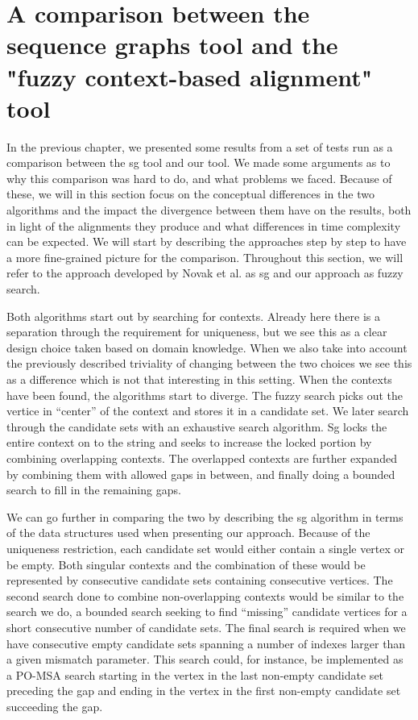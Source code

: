 \documentclass[thesis.tex]{subfiles}
\begin{document}
\section{A comparison between the sequence graphs tool and the "fuzzy context-based alignment" tool}
\label{sec:conceptual_comparison}
In the previous chapter, we presented some results from a set of tests run as a comparison between the sg tool and our tool. We made some arguments as to why this comparison was hard to do, and what problems we faced. Because of these, we will in this section focus on the conceptual differences in the two algorithms and the impact the divergence between them have on the results, both in light of the alignments they produce and what differences in time complexity can be expected. We will start by describing the approaches step by step to have a more fine-grained picture for the comparison. Throughout this section, we will refer to the approach developed by Novak et al. as sg and our approach as fuzzy search.\\
\par\noindent
Both algorithms start out by searching for contexts. Already here there is a separation through the requirement for uniqueness, but we see this as a clear design choice taken based on domain knowledge. When we also take into account the previously described triviality of changing between the two choices we see this as a difference which is not that interesting in this setting. When the contexts have been found, the algorithms start to diverge. The fuzzy search picks out the vertice in ``center'' of the context and stores it in a candidate set. We later search through the candidate sets with an exhaustive search algorithm. Sg locks the entire context on to the string and seeks to increase the locked portion by combining overlapping contexts. The overlapped contexts are further expanded by combining them with allowed gaps in between, and finally doing a bounded search to fill in the remaining gaps.\\
\par\noindent
We can go further in comparing the two by describing the sg algorithm in terms of the data structures used when presenting our approach. Because of the uniqueness restriction, each candidate set would either contain a single vertex or be empty. Both singular contexts and the combination of these would be represented by consecutive candidate sets containing consecutive vertices. The second search done to combine non-overlapping contexts would be similar to the search we do, a bounded search seeking to find ``missing'' candidate vertices for a short consecutive number of candidate sets. The final search is required when we have consecutive empty candidate sets spanning a number of indexes larger than a given mismatch parameter. This search could, for instance, be implemented as a PO-MSA search starting in the vertex in the last non-empty candidate set preceding the gap and ending in the vertex in the first non-empty candidate set succeeding the gap.\\
\end{document}
